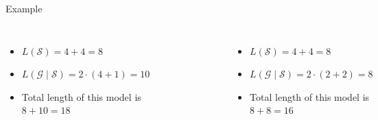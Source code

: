 \documentclass[10pt]{beamer}
\begin{document}
\begin{frame}{Example}

    \begin{columns}[T, onlytextwidth]
            \begin{itemize}
                \item $L(\mathcal{S}) = 4 + 4 = 8$
                \item $L(\mathcal{G} \mid \mathcal{S}) = 2\cdot (4 + 1) = 10$
                \item Total length of this model is $8 + 10 = 18$
            \end{itemize}

        \begin{figure}
            \centering
            \includegraphics[scale=0.5]{figures/running-example/MDL/example-1.pdf}
        \end{figure}


            \begin{itemize}
                \item $L(\mathcal{S}) = 4 + 4 = 8$
                \item $L(\mathcal{G} \mid \mathcal{S}) = 2\cdot (2 + 2) = 8$
                \item Total length of this model is $8 + 8 = 16$
            \end{itemize}


\end{columns}
\end{frame}
\end{document}
